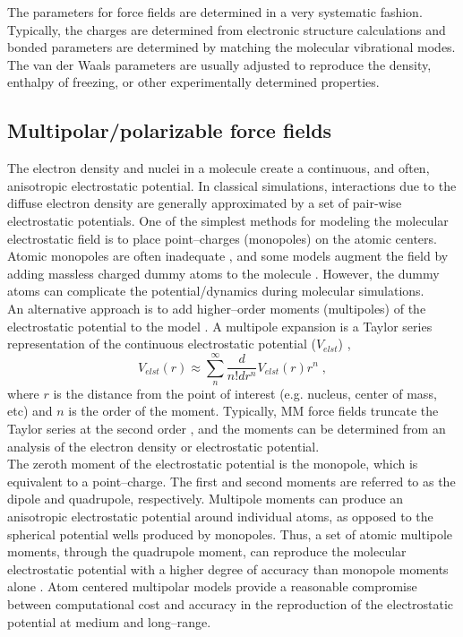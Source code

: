 \documentclass[12pt]{report}
\begin{document}
The parameters for force fields are determined in a very systematic fashion.
Typically, the charges are determined from electronic structure calculations
and bonded parameters are determined by matching the molecular vibrational
modes.
The van der Waals parameters are usually adjusted to reproduce the density,
enthalpy of freezing, or other experimentally determined properties.

\subsection{Multipolar/polarizable force fields}

The electron density and nuclei in a molecule create a continuous, and often,
anisotropic electrostatic potential.
In classical simulations, interactions due to the diffuse electron density are
generally approximated by a set of pair-wise electrostatic potentials.
One of the simplest methods for modeling the molecular electrostatic field is
to place point--charges (monopoles) on the atomic centers.
Atomic monopoles are often inadequate \cite{Cisneros2014,Kramer2014}, and
some models augment the field by adding massless charged dummy atoms to the
molecule \cite{Jorgensen1983,Mahoney2000}.
However, the dummy atoms can complicate the potential/dynamics during
molecular simulations. \\

An alternative approach is to add higher--order moments (multipoles) of the
electrostatic potential to the model
\cite{Cisneros2014,Laury2015,Shi2013,Stone2013}.
A multipole expansion is a Taylor series representation of the continuous
electrostatic potential ($V_{elst}$) \cite{Stone2013},
\begin{equation}
 V_{elst}(r) \approx \sum_n^\infty \frac{d}{n!dr^n} V_{elst}(r)r^n \; ,
\end{equation}
where $r$ is the distance from the point of interest (e.g. nucleus, center of
mass, etc) and $n$ is the order of the moment.
Typically, MM force fields truncate the Taylor series at the second order
\cite{Cisneros2014,Laury2015,Shi2013}, and the moments can be determined
from an analysis of the electron density or electrostatic potential. \\

The zeroth moment of the electrostatic potential is the monopole, which is
equivalent to a point--charge.
The first and second moments are referred to as the dipole and quadrupole,
respectively. Multipole moments can produce an anisotropic electrostatic
potential around individual atoms, as opposed to the spherical potential
wells produced by monopoles.
Thus, a set of atomic multipole moments, through the quadrupole moment, can
reproduce the molecular electrostatic potential with a higher degree of
accuracy than monopole moments alone \cite{Cisneros2014,Stone2013}.
Atom centered multipolar models provide a reasonable compromise between
computational cost and accuracy in the reproduction of the electrostatic
potential at medium and long--range.
\end{document}

